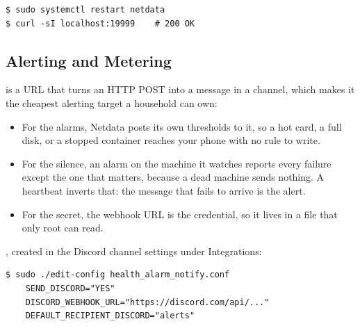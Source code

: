 \begin{verbatim}
$ sudo systemctl restart netdata
$ curl -sI localhost:19999    # 200 OK
\end{verbatim}


\subsection{Alerting and Metering}

 is a URL that turns an HTTP POST into a message in
a channel, which makes it the cheapest alerting target a household can
own\cite{discordWebhooks}:

\begin{itemize}[topsep=0.25em, itemsep=0.4em, parsep=0em]
    \item For the alarms, Netdata posts its own thresholds to it, so a hot card, a
    full disk, or a stopped container reaches your phone with no rule to write.
    \item For the silence, an alarm on the machine it watches reports every
    failure except the one that matters, because a dead machine sends nothing. A
    heartbeat inverts that: the message that fails to arrive is the alert.
    \item For the secret, the webhook URL is the credential, so it lives in a
    file that only root can read.
\end{itemize}

, created in the Discord channel settings
under Integrations:

\begin{verbatim}
$ sudo ./edit-config health_alarm_notify.conf
    SEND_DISCORD="YES"
    DISCORD_WEBHOOK_URL="https://discord.com/api/..."
    DEFAULT_RECIPIENT_DISCORD="alerts"
\end{verbatim}


